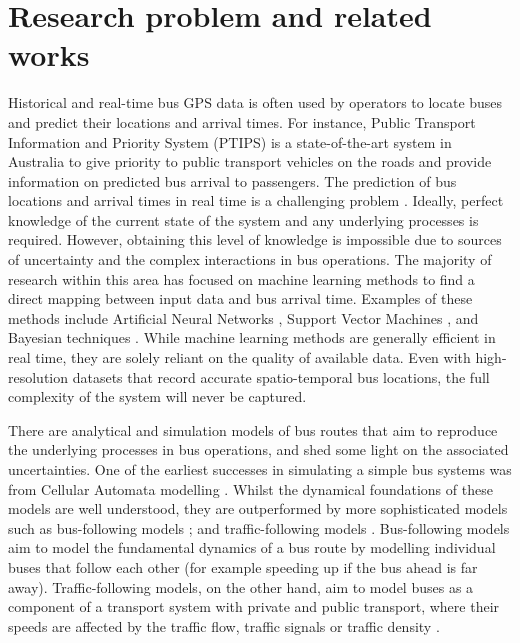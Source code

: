 % 
\section{Research problem and related works} \label{s:problem}

Historical and real-time bus GPS data is often used by operators to locate buses and predict their locations and arrival times. For instance, Public Transport Information and Priority System (PTIPS) is a state-of-the-art system in Australia to give priority to public transport vehicles on the roads and provide information on predicted bus arrival to passengers. The prediction of bus locations and arrival times in real time is a challenging problem \citep{chien2002dynamic}. Ideally, perfect 
knowledge of the current state of the system and any underlying processes is required.  However, obtaining this level of knowledge is impossible due to sources of uncertainty and the complex interactions in
bus operations. The majority of research within this area has focused on machine learning methods to find a direct mapping between input
data and bus arrival time. Examples of these methods include Artificial
Neural Networks \citep{chien2002dynamic}, Support Vector Machines
\citep{bin2006bus}, and Bayesian techniques
\citep{khosravi2011prediction}. While machine learning methods are generally
efficient in real time, they are solely reliant on the quality of available
data. Even with high-resolution datasets that record accurate spatio-temporal bus locations, the full complexity of the system will never be captured. 


There are analytical and simulation models of bus routes that aim to
reproduce the underlying processes in bus operations, and shed some
light on the associated uncertainties. One of the earliest successes in simulating a simple bus systems was from Cellular Automata modelling
\citep{luo2012realistic,o1998jamming,chowdhury2000steady,
jiang2003realistic}. Whilst the dynamical foundations of these models
are well understood, they are outperformed by more sophisticated
models such as bus-following models
\citep{nagatani2000kinetic,huijberts2002analysis,Tang2012,
nagatani2001bunching,hill2003numerical}; and traffic-following models
\citep{cats2010mesoscopic,toledo2010mesoscopic,hans2015real}.
Bus-following models aim to model the fundamental dynamics of a bus
route by modelling individual buses that follow each other (for example speeding up if the bus ahead is far away). Traffic-following models,
on the other hand, aim to model buses as a component of a transport
system with private and public transport, where their speeds are
affected by the traffic flow, traffic signals \citep{hans2015real} or
traffic density \citep{toledo2010mesoscopic}.

